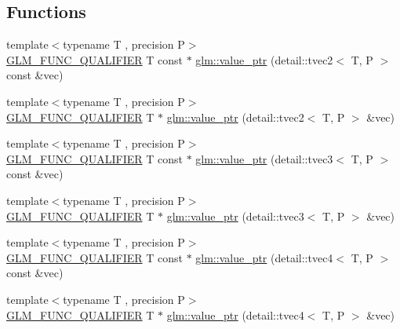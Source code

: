 \subsection*{Functions}
\begin{DoxyCompactItemize}
\item 
{\footnotesize template$<$typename T , precision P$>$ }\\\hyperlink{setup_8hpp_a33fdea6f91c5f834105f7415e2a64407}{G\+L\+M\+\_\+\+F\+U\+N\+C\+\_\+\+Q\+U\+A\+L\+I\+F\+I\+ER} T const  $\ast$ \hyperlink{group__gtc__type__ptr_gac57a976f59e794e6406ecf2924a18f4e}{glm\+::value\+\_\+ptr} (detail\+::tvec2$<$ T, P $>$ const \&vec)
\item 
{\footnotesize template$<$typename T , precision P$>$ }\\\hyperlink{setup_8hpp_a33fdea6f91c5f834105f7415e2a64407}{G\+L\+M\+\_\+\+F\+U\+N\+C\+\_\+\+Q\+U\+A\+L\+I\+F\+I\+ER} T $\ast$ \hyperlink{group__gtc__type__ptr_gac2a64387090621acf7176b63f31b70a2}{glm\+::value\+\_\+ptr} (detail\+::tvec2$<$ T, P $>$ \&vec)
\item 
{\footnotesize template$<$typename T , precision P$>$ }\\\hyperlink{setup_8hpp_a33fdea6f91c5f834105f7415e2a64407}{G\+L\+M\+\_\+\+F\+U\+N\+C\+\_\+\+Q\+U\+A\+L\+I\+F\+I\+ER} T const  $\ast$ \hyperlink{group__gtc__type__ptr_ga676a0ba6f4b7cd817fe6d16cb3113857}{glm\+::value\+\_\+ptr} (detail\+::tvec3$<$ T, P $>$ const \&vec)
\item 
{\footnotesize template$<$typename T , precision P$>$ }\\\hyperlink{setup_8hpp_a33fdea6f91c5f834105f7415e2a64407}{G\+L\+M\+\_\+\+F\+U\+N\+C\+\_\+\+Q\+U\+A\+L\+I\+F\+I\+ER} T $\ast$ \hyperlink{group__gtc__type__ptr_ga4babc9956e32bbd0769bc20ab2d73800}{glm\+::value\+\_\+ptr} (detail\+::tvec3$<$ T, P $>$ \&vec)
\item 
{\footnotesize template$<$typename T , precision P$>$ }\\\hyperlink{setup_8hpp_a33fdea6f91c5f834105f7415e2a64407}{G\+L\+M\+\_\+\+F\+U\+N\+C\+\_\+\+Q\+U\+A\+L\+I\+F\+I\+ER} T const  $\ast$ \hyperlink{group__gtc__type__ptr_ga6963deec2c77b8a49b3f7e434914f6ba}{glm\+::value\+\_\+ptr} (detail\+::tvec4$<$ T, P $>$ const \&vec)
\item 
{\footnotesize template$<$typename T , precision P$>$ }\\\hyperlink{setup_8hpp_a33fdea6f91c5f834105f7415e2a64407}{G\+L\+M\+\_\+\+F\+U\+N\+C\+\_\+\+Q\+U\+A\+L\+I\+F\+I\+ER} T $\ast$ \hyperlink{group__gtc__type__ptr_gaa3ed69a05293987972b589311e5feb23}{glm\+::value\+\_\+ptr} (detail\+::tvec4$<$ T, P $>$ \&vec)

\end{DoxyCompactItemize}
